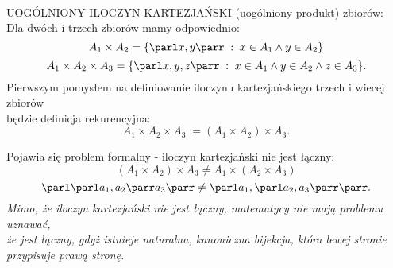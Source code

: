 \bigskip\\

{\large{\color{def} UOGÓLNIONY ILOCZYN KARTEZJAŃSKI} (uogólniony produkt) zbiorów:}\medskip\\
Dla dwóch i trzech zbiorów mamy odpowiednio:
$$A_1\times A_2=\{\parl x,y\parr\;:\;x\in A_1\land y\in A_2\}$$
$$A_1\times A_2\times A_3=\{\parl x,y,z\parr\;:\;x\in A_1\land y\in A_2\land z\in A_3\}.$$
Pierwszym pomysłem na definiowanie iloczynu kartezjańskiego trzech i wiecej zbiorów \\będzie definicja rekurencyjna:
$$A_1\times A_2\times A_3:=(A_1\times A_2)\times A_3.$$

Pojawia się problem formalny - {\color{emp}iloczyn kartezjański nie jest łączny}:
$$(A_1\times A_2)\times A_3\neq A_1\times (A_2\times A_3)$$
$$\parl\parl a_1, a_2\parr a_3\parr\neq\parl a_1,\parl a_2,a_3\parr\parr.$$
\emph{Mimo, że iloczyn kartezjański nie jest łączny, matematycy nie mają problemu uznawać, \\że jest łączny, gdyż {\color{acc}istnieje naturalna, kanoniczna bijekcja}, która lewej stronie \\przypisuje prawą stronę.}\medskip\\

